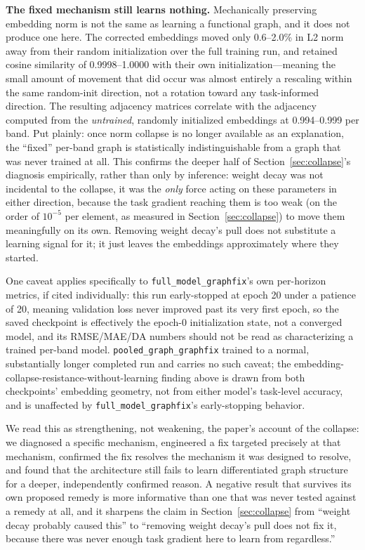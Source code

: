 \documentclass[journal]{IEEEtran}
\begin{document}
\textbf{The fixed mechanism still learns nothing.} Mechanically preserving embedding norm is not the same as learning a functional graph, and it does not produce one here. The corrected embeddings moved only 0.6--2.0\% in L2 norm away from their random initialization over the full training run, and retained cosine similarity of 0.9998--1.0000 with their own initialization---meaning the small amount of movement that did occur was almost entirely a rescaling within the same random-init direction, not a rotation toward any task-informed direction. The resulting adjacency matrices correlate with the adjacency computed from the \emph{untrained}, randomly initialized embeddings at 0.994--0.999 per band. Put plainly: once norm collapse is no longer available as an explanation, the ``fixed'' per-band graph is statistically indistinguishable from a graph that was never trained at all. This confirms the deeper half of Section~\ref{sec:collapse}'s diagnosis empirically, rather than only by inference: weight decay was not incidental to the collapse, it was the \emph{only} force acting on these parameters in either direction, because the task gradient reaching them is too weak (on the order of $10^{-5}$ per element, as measured in Section~\ref{sec:collapse}) to move them meaningfully on its own. Removing weight decay's pull does not substitute a learning signal for it; it just leaves the embeddings approximately where they started.

One caveat applies specifically to \texttt{full\_model\_graphfix}'s own per-horizon metrics, if cited individually: this run early-stopped at epoch 20 under a patience of 20, meaning validation loss never improved past its very first epoch, so the saved checkpoint is effectively the epoch-0 initialization state, not a converged model, and its RMSE/MAE/DA numbers should not be read as characterizing a trained per-band model. \texttt{pooled\_graph\_graphfix} trained to a normal, substantially longer completed run and carries no such caveat; the embedding-collapse-resistance-without-learning finding above is drawn from both checkpoints' embedding geometry, not from either model's task-level accuracy, and is unaffected by \texttt{full\_model\_graphfix}'s early-stopping behavior.

We read this as strengthening, not weakening, the paper's account of the collapse: we diagnosed a specific mechanism, engineered a fix targeted precisely at that mechanism, confirmed the fix resolves the mechanism it was designed to resolve, and found that the architecture still fails to learn differentiated graph structure for a deeper, independently confirmed reason. A negative result that survives its own proposed remedy is more informative than one that was never tested against a remedy at all, and it sharpens the claim in Section~\ref{sec:collapse} from ``weight decay probably caused this'' to ``removing weight decay's pull does not fix it, because there was never enough task gradient here to learn from regardless.''
\end{document}
